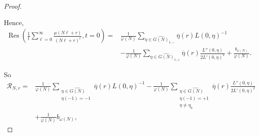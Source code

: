 \documentclass[10pt,a4paper]{amsart}
\begin{document}
\begin{proof}
\begin{enumerate}[label= \roman*)]
Hence,
\[
\begin{split}
\operatorname{Res} \left( \frac{1}{t} \sum_{\ell=0}^\infty \frac{\mu(N\ell + r)}{(N\ell + r)^t},t=0 \right)
=& \frac{1}{\varphi(N)} \sum_{\eta \in \widehat{G(N)}_{1,-}} \overline{\eta}(r) L(0,\eta)^{-1}\\
&- \frac{1}{\varphi(N)} \sum_{\eta \in \widehat{G(N)}_{1,+}} \overline{\eta}(r) \frac{L''(0,\eta)}{2 L'(0,\eta)^2}
+ \frac{b_{\omega(N)}}{\varphi(N)}.
\end{split}
\]
\end{enumerate}
So
\begin{equation*}
\begin{split}
\mathscr{R}_{N,r} = 
&\frac{1}{\varphi(N)} \sum_{\substack{\eta \in \widehat{G(N)} \\ \eta(-1) = -1}} \overline{\eta}(r)  L(0,\eta)^{-1} - \frac{1}{\varphi(N)} \sum_{\substack{\eta \in \widehat{G(N)} \\ \eta(-1) = +1 \\ \eta \ne \eta_0}} \overline{\eta}(r) \frac{L''(0,\eta)}{2 L'(0,\eta)^2} \\
&+ \frac{1}{\varphi(N)} b_{\omega(N)},
\end{split}
\end{equation*}


\end{proof}
\end{document}
